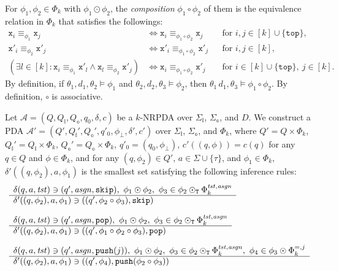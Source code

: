 \documentclass[oribibl,envcountsame,dvipdfmx]{llncs}
\newcommand{\tst}{\mathit{tst}}
\newcommand{\asgn}{\mathit{asgn}}
\renewcommand{\skip}{\mathtt{skip}}
\newcommand{\pop}{\mathtt{pop}}
\newcommand{\push}{\mathtt{push}}
\renewcommand{\top}{\mathtt{top}}
\newcommand{\calA}{\mathcal{A}}
\renewcommand{\L}{\mathtt{x}}
\newcommand{\R}{\mathtt{x}'}
\newcommand{\COMP}{\circ}
\newcommand{\COMPBL}{\odot}
\newcommand{\COMPBLT}{\COMPBL_{\mathtt{T}}}
\newcommand{\phizero}{\phi_{\bot}}
\newcommand{\QI}{Q_{\mathbb{i}}}
\newcommand{\QO}{Q_{\mathbb{o}}}
\newcommand{\SigmaI}{\Sigma_{\mathbb{i}}}
\newcommand{\SigmaO}{\Sigma_{\mathbb{o}}}
\begin{document}
For $\phi_1,\phi_2\in\Phi_k$ with $\phi_1\COMPBL\phi_2$,
the \emph{composition} $\phi_1\COMP\phi_2$ of them
is the equivalence relation in $\Phi_k$ that satisfies the followings:
\begin{align*}
  \L_i \equiv_{\phi_1} \L_j &\Leftrightarrow
  \L_i \equiv_{\phi_1\COMP\phi_2} \L_j &&\text{for } i,j\in [k]\cup\{\top\},\\
  \R_i \equiv_{\phi_2} \R_j &\Leftrightarrow
  \R_i \equiv_{\phi_1\COMP\phi_2} \R_j &&\text{for } i,j\in [k],\\
  (\exists l\in [k] : \L_i \equiv_{\phi_1} \R_l \mathrel{\land}
  \L_l \equiv_{\phi_2} \R_j) &\Leftrightarrow
  \L_i \equiv_{\phi_1\COMP\phi_2} \R_j
  &&\text{for } i\in[k]\cup\{\top\},\ j\in [k].
\end{align*}
%
By definition,
if $\theta_1,d_1,\theta_2\models\phi_1$ and
$\theta_2,d_2,\theta_3\models\phi_2$,
then
$\theta_1\,d_1,\theta_3\models\phi_1\COMP\phi_2$.
By definition, $\COMP$ is associative.

\smallskip

Let $\calA=(Q,\QI,\QO,q_0,\delta,c)$ be a $k$-NRPDA
over $\SigmaI$, $\SigmaO$, and $D$.
We construct a PDA
$\calA'=(Q',\QI',\QO',q'_0,\phizero,\delta',c')$
over $\SigmaI$, $\SigmaO$, and $\Phi_k$,
where $Q'=Q\times\Phi_k$, $\QI'=\QI\times\Phi_k$, $\QO'=\QO\times\Phi_k$,
$q'_0=(q_0,\phizero)$,
$c'((q,\phi))=c(q)$ for any $q\in Q$ and $\phi\in\Phi_k$,
and for any $(q,\phi_2)\in Q'$, $a\in\Sigma\cup\{\tau\}$,
and $\phi_1\in\Phi_k$,
$\delta'((q,\phi_2),a,\phi_1)$ is the smallest set
satisfying the following inference rules:
%
\begin{align}
&
\begin{array}{l}
  \delta(q,a,\tst) \ni (q',\asgn,\skip), \
  \phi_1\COMPBL\phi_2, \
  \phi_3\in \phi_2\COMPBLT\Phi_k^{\tst,\asgn}
  \\ \hline
  \delta'((q,\phi_2),a,\phi_1) \ni ((q',\phi_2\COMP\phi_3),\skip)
\end{array}
%
\\[\medskipamount]
&
\begin{array}{l}
  \delta(q,a,\tst) \ni (q',\asgn,\pop), \
  \phi_1\COMPBL\phi_2, \
  \phi_3\in \phi_2\COMPBLT\Phi_k^{\tst,\asgn}
  \\ \hline
  \delta'((q,\phi_2),a,\phi_1) \ni ((q',\phi_1\COMP\phi_2\COMP\phi_3),\pop)
\end{array}
%
\\[\medskipamount]
&
\begin{array}{l}
  \delta(q,a,\tst) \ni (q',\asgn,\push(j)), \
  \phi_1\COMPBL\phi_2, \
  \phi_3\in \phi_2\COMPBLT\Phi_k^{\tst,\asgn}, \
  \phi_4\in \phi_3\COMPBL\Phi_k^{=,j}
  \\ \hline
  \delta'((q,\phi_2),a,\phi_1) \ni ((q',\phi_4),\push(\phi_2\COMP\phi_3))
\end{array}
%
\end{align}
\end{document}
